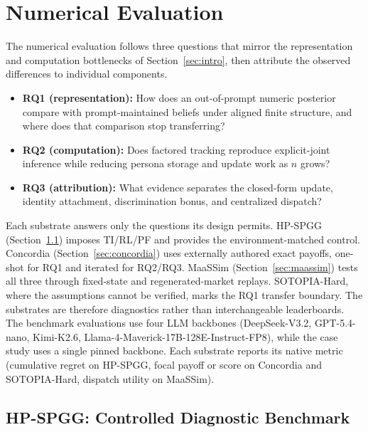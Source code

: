 \documentclass[letterpaper]{article} %
\begin{document}
\section{Numerical Evaluation}
\label{sec:experiments-llm}

The numerical evaluation follows three questions that mirror the representation and computation bottlenecks of Section~\ref{sec:intro}, then attribute the observed differences to individual components.
\begin{itemize}[leftmargin=1.5em, itemsep=0.2em, topsep=0.2em, parsep=0pt]
\item \textbf{RQ1 (representation):} How does an out-of-prompt numeric posterior compare with prompt-maintained beliefs under aligned finite structure, and where does that comparison stop transferring?
\item \textbf{RQ2 (computation):} Does factored tracking reproduce explicit-joint inference while reducing persona storage and update work as $n$ grows?
\item \textbf{RQ3 (attribution):} What evidence separates the closed-form update, identity attachment, discrimination bonus, and centralized dispatch?
\end{itemize}

Each substrate answers only the questions its design permits. HP-SPGG (Section~\ref{sec:hp-spgg}) imposes TI/RL/PF and provides the environment-matched control. Concordia (Section~\ref{sec:concordia}) uses externally authored exact payoffs, one-shot for RQ1 and iterated for RQ2/RQ3. MaaSSim (Section~\ref{sec:maassim}) tests all three through fixed-state and regenerated-market replays. SOTOPIA-Hard, where the assumptions cannot be verified, marks the RQ1 transfer boundary. The substrates are therefore diagnostics rather than interchangeable leaderboards. The benchmark evaluations use four LLM
backbones (DeepSeek-V3.2, GPT-5.4-nano, Kimi-K2.6,
Llama-4-Maverick-17B-128E-Instruct-FP8), while the case study uses a single pinned backbone. Each substrate
reports its native metric (cumulative regret on HP-SPGG, focal payoff or score on Concordia and SOTOPIA-Hard, dispatch utility on MaaSSim).

\subsection{HP-SPGG: Controlled Diagnostic Benchmark}
\label{sec:hp-spgg}
\end{document}
